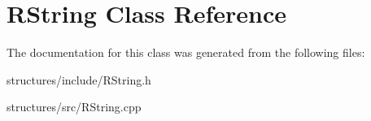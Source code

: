 \hypertarget{classRString}{
\section{RString Class Reference}
\label{classRString}
}


The documentation for this class was generated from the following files:\begin{DoxyCompactItemize}
\item 
structures/include/RString.h\item 
structures/src/RString.cpp\end{DoxyCompactItemize}

